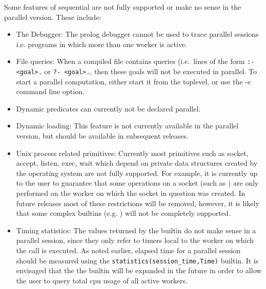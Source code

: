 Some features of sequential {\eclipse} are not fully
supported or make no sense in the parallel version. These include:
\begin{itemize}

\item The Debugger: The prolog debugger cannot be used to trace parallel 
sessions i.e. programs in which more than one worker is active. 

\item File queries: When a compiled file contains queries (i.e.\ lines of
the form \verb/:- <goal>./ or \verb/?- <goal>./, then these goals will not
be executed in parallel. To start a parallel computation, either start
it from the toplevel, or use the -e command line option.

\item Dynamic predicates can currently not be declared parallel.

\item Dynamic loading: This feature is not currently available in 
the parallel version, but should be available in subsequent releases.

\item Unix process related primitives: Currently most primitives such as
socket, accept, listen, exec, wait which depend on private data
structures created by the operating system are not fully
supported. For example, it is currently up to the user to guarantee
that some operations on a socket (such as ) are only performed
on the worker on which the socket in question was created. In future
releases most of these restrictions will be removed, however, it is
likely that some complex builtins (e.g. ) will not be completely
supported.


\item Timing statistics: The values returned by the 
builtin do not make sense in a parallel session, since they only refer
to timers local to the worker on which the call is executed. As noted
earlier, elapsed time for a parallel session should be measured using
the {\tt statistics(session_time,Time)} builtin. It is envisaged that the the
 builtin will be expanded in the future in order to allow
the user to query total cpu usage of all active workers.

\end{itemize}
